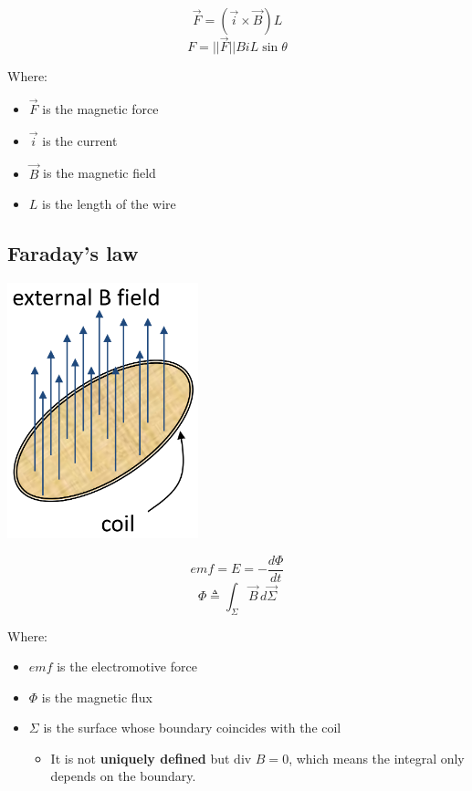 \documentclass[11pt]{article}
\begin{document}
\[\vec{F} = (\vec{i} \times \vec{B}) L\]
\[F = || \vec{F} || BiL \sin \theta\]

Where:
\begin{itemize}
\item \(\vec{F}\) is the magnetic force
\item \(\vec{i}\) is the current
\item \(\vec{B}\) is the magnetic field
\item \(L\) is the length of the wire
\end{itemize}
\subsection{Faraday's law}
\label{sec:org1cc2f02}
\begin{center}
\includegraphics[height=20em]{./images/faradays-law-diagram.png}
\end{center}

\[emf = E = -\frac{d \Phi}{dt}\]
\[\Phi \triangleq \int_{\Sigma} \vec{B} \, d \vec{\Sigma}\]

Where:
\begin{itemize}
\item \(emf\) is the electromotive force
\item \(\Phi\) is the magnetic flux
\item \(\Sigma\) is the surface whose boundary coincides with the coil
\begin{itemize}
\item It is not \textbf{uniquely defined} but \(\text{div } B = 0\), which means the integral only depends on the boundary.
\end{itemize}
\end{itemize}

 \newpage
\end{document}
